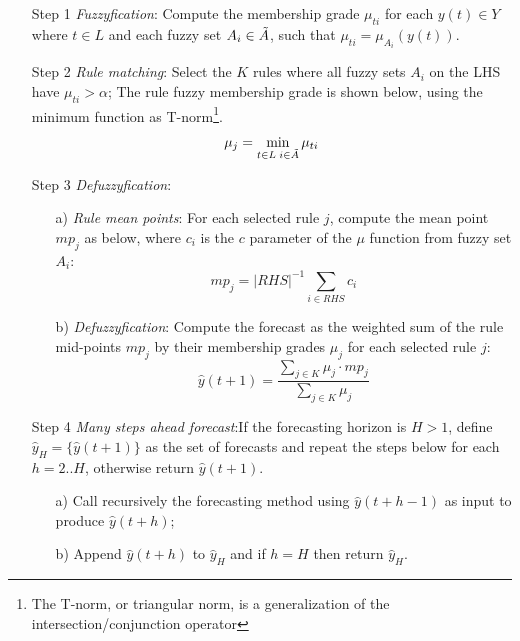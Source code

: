 \begin{enumerate}
\item [Step 1] \textit{Fuzzyfication}: Compute the membership grade $\mu_{ti}$ for each $y(t) \in Y$ where $t \in L$ and each fuzzy set $A_i \in \Tilde{A}$, such that $\mu_{ti} = \mu_{A_i}(y(t))$.

\item [Step 2] \textit{Rule matching}: Select the $K$ rules where all fuzzy sets $A_i$ on the LHS have $\mu_{ti} > \alpha$; The rule fuzzy membership grade is shown below, using the minimum function as T-norm\footnote{The T-norm, or triangular norm, is a generalization of the intersection/conjunction operator}.
\begin{equation}
    \mu_j = \min_{t\in L\; i \in \Tilde{A}} \mu_{ti}
\end{equation}
\item [Step 3] \textit{Defuzzyfication}: 
\begin{enumerate}
\item [a)] \textit{Rule mean points}: For each selected rule $j$, compute the mean point $mp_j$ as below, where $c_{i}$ is the $c$ parameter of the $\mu$ function from fuzzy set $A_i$:
\begin{equation}
mp_j = |RHS|^{-1}\sum_{i \in RHS} c_i
\end{equation}
\item [b)] \textit{Defuzzyfication}: Compute the forecast as the weighted sum of the rule mid-points $mp_j$ by their membership grades $\mu_j$ for each selected rule $j$:
\begin{equation}
\hat{y}(t+1) = \frac{\sum_{j \in K} \mu_j \cdot mp_j}{\sum_{j \in K} \mu_j}
\end{equation}
\end{enumerate}
\item[Step 4] \textit{Many steps ahead forecast}:If the forecasting horizon is $H > 1$, define $\hat{y}_H = \{\hat{y}(t+1)\}$ as the set of forecasts and repeat the steps below for each $h=2..H$, otherwise return  $\hat{y}(t+1)$.
\begin{enumerate}
    \item[a)]  Call recursively the forecasting method using $\hat{y}(t+h-1)$ as input to produce $\hat{y}(t+h)$;
    \item[b)] Append $\hat{y}(t+h)$ to $\hat{y}_H$ and if $h = H$ then return $\hat{y}_H$.
\end{enumerate}
\end{enumerate}



